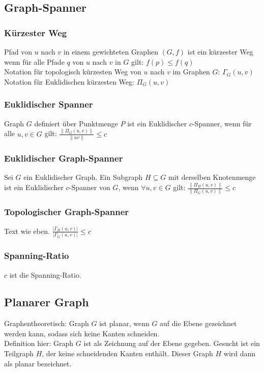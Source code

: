 \documentclass{article}
\begin{document}
\subsection*{Graph-Spanner}
\subsubsection*{Kürzester Weg}
Pfad von $u$ nach $v$ in einem gewichteten Graphen $(G,f)$ ist ein
kürzester Weg wenn für alle Pfade $q$ von $u$ nach $v$ in $G$ gilt:
$f(p) \leq f(q)$ \\
Notation für topologisch kürzesten Weg von $u$ nach $v$ im Graphen $G$:
$\Gamma_G(u,v)$ \\
Notation für Euklidischen kürzesten Weg: $\Pi_G(u,v)$

\subsubsection*{Euklidischer Spanner}
Graph $G$ definiert über Punktmenge $P$ ist ein Euklidischer
$c$-Spanner, wenn für alle $u,v \in G$ gilt: $\displaystyle
\frac{\|\Pi_G(u,v)\|}{\|uv\|} \leq c$

\subsubsection*{Euklidischer Graph-Spanner}
Sei $G$ ein Euklidischer Graph. Ein Subgraph $H \subseteq G$ mit
derselben Knotenmenge ist ein Euklidischer $c$-Spanner von $G$, wenn
$\forall u,v \in G$ gilt: $\displaystyle
\frac{\|\Pi_H(u,v)\|}{\|\Pi_G(u,v)\|} \leq c$

\subsubsection*{Topologischer Graph-Spanner}
Text wie eben. $\displaystyle \frac{|\Gamma_H(u,v)|}{|\Gamma_G(u,v)|}
\leq c$

\subsubsection*{Spanning-Ratio}
$c$ ist die Spanning-Ratio.

\subsection*{Planarer Graph}
Graphentheoretisch: Graph $G$ ist planar, wenn $G$ auf die Ebene
gezeichnet werden kann, sodass sich keine Kanten schneiden. \\
Definition hier: Graph $G$ ist als Zeichnung auf der Ebene gegeben.
Gesucht ist ein Teilgraph $H$, der keine schneidenden Kanten enthält.
Dieser Graph $H$ wird dann als planar bezeichnet.
\end{document}
